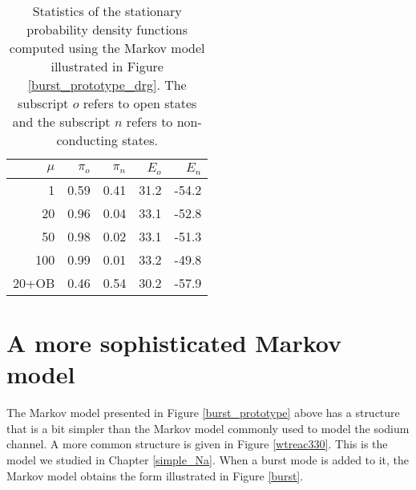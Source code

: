 


\begin{table}  \begin{center}
\begin{tabular}{|r|r|r|r|r|} \hline
$\mu$ & $\pi_o$ & $\pi_n$ & $E_o$ & $E_n$ \\ \hline
1 & 0.59 & 0.41 & 31.2 & -54.2 \\ \hline
20 & 0.96 & 0.04 & 33.1 & -52.8 \\ \hline
50 & 0.98 & 0.02 & 33.1 & -51.3 \\ \hline
100 & 0.99 & 0.01 & 33.2 & -49.8 \\ \hline
20+OB & 0.46 & 0.54 & 30.2 & -57.9 \\ \hline
\end{tabular} \end{center}
\caption{Statistics of the stationary probability density functions computed using the Markov model illustrated in Figure
\ref{burst_prototype_drg}. The subscript $o$ refers to open states and the subscript $n$ refers to non-conducting states.
 \label{tab:burst_stat}}
\end{table}



\section{A more sophisticated Markov model \label{sophisticated}}

The Markov model presented in Figure \ref{burst_prototype} above has a structure that is a bit simpler than
the Markov model commonly used to model the sodium channel. A more common structure is given in 
Figure \ref{wtreac330}. This is the model we studied in Chapter \ref{simple_Na}. When a burst mode is added to it, the Markov model obtains the form illustrated in Figure \ref{burst}.


